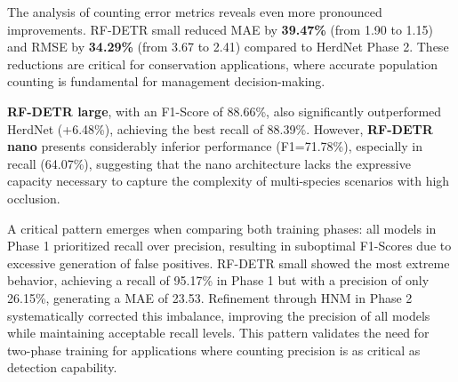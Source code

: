 The analysis of counting error metrics reveals even more pronounced improvements. RF-DETR small reduced MAE by \textbf{39.47\%} (from 1.90 to 1.15) and RMSE by \textbf{34.29\%} (from 3.67 to 2.41) compared to HerdNet Phase 2. These reductions are critical for conservation applications, where accurate population counting is fundamental for management decision-making.

\textbf{RF-DETR large}, with an F1-Score of 88.66\%, also significantly outperformed HerdNet (+6.48\%), achieving the best recall of 88.39\%. However, \textbf{RF-DETR nano} presents considerably inferior performance (F1=71.78\%), especially in recall (64.07\%), suggesting that the nano architecture lacks the expressive capacity necessary to capture the complexity of multi-species scenarios with high occlusion.

A critical pattern emerges when comparing both training phases: all models in Phase 1 prioritized recall over precision, resulting in suboptimal F1-Scores due to excessive generation of false positives. RF-DETR small showed the most extreme behavior, achieving a recall of 95.17\% in Phase 1 but with a precision of only 26.15\%, generating a MAE of 23.53. Refinement through HNM in Phase 2 systematically corrected this imbalance, improving the precision of all models while maintaining acceptable recall levels. This pattern validates the need for two-phase training for applications where counting precision is as critical as detection capability.

